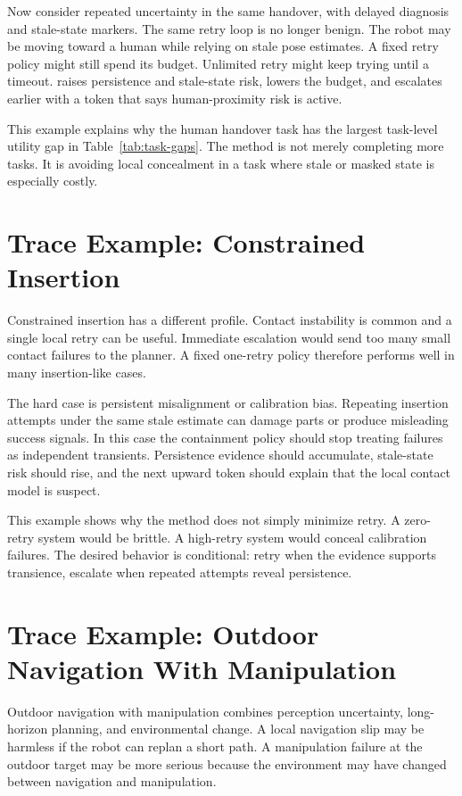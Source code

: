 Now consider repeated uncertainty in the same handover, with delayed diagnosis and stale-state markers. The same retry loop is no longer benign. The robot may be moving toward a human while relying on stale pose estimates. A fixed retry policy might still spend its budget. Unlimited retry might keep trying until a timeout. \method raises persistence and stale-state risk, lowers the budget, and escalates earlier with a token that says human-proximity risk is active.

This example explains why the human handover task has the largest task-level utility gap in Table~\ref{tab:task-gaps}. The method is not merely completing more tasks. It is avoiding local concealment in a task where stale or masked state is especially costly.

\section{Trace Example: Constrained Insertion}

Constrained insertion has a different profile. Contact instability is common and a single local retry can be useful. Immediate escalation would send too many small contact failures to the planner. A fixed one-retry policy therefore performs well in many insertion-like cases.

The hard case is persistent misalignment or calibration bias. Repeating insertion attempts under the same stale estimate can damage parts or produce misleading success signals. In this case the containment policy should stop treating failures as independent transients. Persistence evidence should accumulate, stale-state risk should rise, and the next upward token should explain that the local contact model is suspect.

This example shows why the method does not simply minimize retry. A zero-retry system would be brittle. A high-retry system would conceal calibration failures. The desired behavior is conditional: retry when the evidence supports transience, escalate when repeated attempts reveal persistence.

\section{Trace Example: Outdoor Navigation With Manipulation}

Outdoor navigation with manipulation combines perception uncertainty, long-horizon planning, and environmental change. A local navigation slip may be harmless if the robot can replan a short path. A manipulation failure at the outdoor target may be more serious because the environment may have changed between navigation and manipulation.

